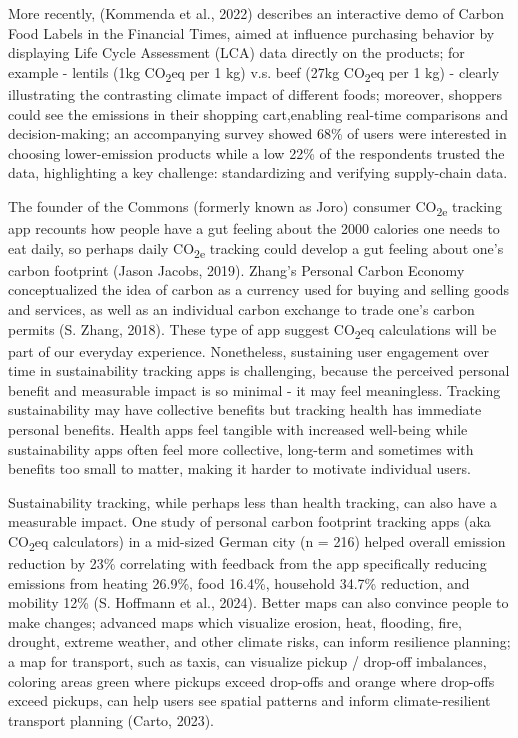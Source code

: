 \documentclass[
  12pt,
  letterpaper,
  DIV=11,
  numbers=noendperiod]{scrartcl}
\begin{document}
More recently, (Kommenda et al., 2022) describes an interactive demo of
Carbon Food Labels in the Financial Times, aimed at influence purchasing
behavior by displaying Life Cycle Assessment (LCA) data directly on the
products; for example - lentils (1kg CO\textsubscript{2}eq per 1 kg)
v.s. beef (27kg CO\textsubscript{2}eq per 1 kg) - clearly illustrating
the contrasting climate impact of different foods; moreover, shoppers
could see the emissions in their shopping cart,enabling real-time
comparisons and decision-making; an accompanying survey showed 68\% of
users were interested in choosing lower-emission products while a low
22\% of the respondents trusted the data, highlighting a key challenge:
standardizing and verifying supply-chain data.

The founder of the Commons (formerly known as Joro) consumer
CO\textsubscript{2e} tracking app recounts how people have a gut feeling
about the 2000 calories one needs to eat daily, so perhaps daily
CO\textsubscript{2e} tracking could develop a gut feeling about one's
carbon footprint (Jason Jacobs, 2019). Zhang's Personal Carbon Economy
conceptualized the idea of carbon as a currency used for buying and
selling goods and services, as well as an individual carbon exchange to
trade one's carbon permits (S. Zhang, 2018). These type of app suggest
CO\textsubscript{2}eq calculations will be part of our everyday
experience. Nonetheless, sustaining user engagement over time in
sustainability tracking apps is challenging, because the perceived
personal benefit and measurable impact is so minimal - it may feel
meaningless.\hspace{0pt} Tracking sustainability may have collective
benefits but tracking health has immediate personal benefits. Health
apps feel tangible with increased well-being while sustainability apps
often feel more collective, long-term and sometimes with benefits too
small to matter, making it harder to motivate individual users.

Sustainability tracking, while perhaps less than health tracking, can
also have a measurable impact. One study of personal carbon footprint
tracking apps (aka CO\textsubscript{2}eq calculators) in a mid-sized
German city (n = 216) helped overall emission reduction by 23\%
correlating with feedback from the app specifically reducing emissions
from heating 26.9\%, food 16.4\%, household 34.7\% reduction, and
mobility 12\% (S. Hoffmann et al., 2024). Better maps can also convince
people to make changes; advanced maps which visualize erosion, heat,
flooding, fire, drought, extreme weather, and other climate risks, can
inform resilience planning; a map for transport, such as taxis, can
visualize pickup / drop-off imbalances, coloring areas green where
pickups exceed drop-offs and orange where drop-offs exceed pickups, can
help users see spatial patterns and inform climate-resilient transport
planning (Carto, 2023).
\end{document}
